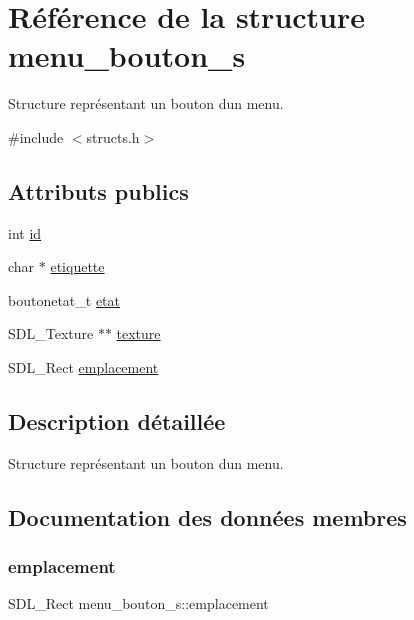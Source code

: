 \hypertarget{structmenu__bouton__s}{}\section{Référence de la structure menu\+\_\+bouton\+\_\+s}
\label{structmenu__bouton__s}


Structure représentant un bouton d\textquotesingle{}un menu.  




{\ttfamily \#include $<$structs.\+h$>$}

\subsection*{Attributs publics}
\begin{DoxyCompactItemize}
\item 
int \hyperlink{structmenu__bouton__s_a16f9dfcf7485d53f26072b6a3503881f}{id}
\item 
char $\ast$ \hyperlink{structmenu__bouton__s_a1cfed146f9b6f75ef3fe35b65515c44d}{etiquette}
\item 
boutonetat\+\_\+t \hyperlink{structmenu__bouton__s_a114cea39e43705c936e2bc3c986c67df}{etat}
\item 
S\+D\+L\+\_\+\+Texture $\ast$$\ast$ \hyperlink{structmenu__bouton__s_abfd7c9a2dd215a5abf19e9f6994d46f5}{texture}
\item 
S\+D\+L\+\_\+\+Rect \hyperlink{structmenu__bouton__s_aa177088c79fe9591831f84a9f112da9c}{emplacement}
\end{DoxyCompactItemize}


\subsection{Description détaillée}
Structure représentant un bouton d\textquotesingle{}un menu. 

\subsection{Documentation des données membres}
\mbox{\label{structmenu__bouton__s_aa177088c79fe9591831f84a9f112da9c}} 
\subsubsection{\texorpdfstring{emplacement}{emplacement}}
{\footnotesize\ttfamily S\+D\+L\+\_\+\+Rect menu\+\_\+bouton\+\_\+s\+::emplacement}

